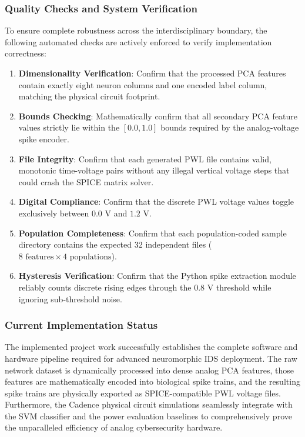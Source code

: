 \documentclass{ieeeaccess}
\begin{document}
\subsubsection{Quality Checks and System Verification}

To ensure complete robustness across the interdisciplinary boundary, the following automated checks are actively enforced to verify implementation correctness:
\begin{enumerate}
\item \textbf{Dimensionality Verification}: Confirm that the processed PCA features contain exactly eight neuron columns and one encoded label column, matching the physical circuit footprint.
\item \textbf{Bounds Checking}: Mathematically confirm that all secondary PCA feature values strictly lie within the $[0.0, 1.0]$ bounds required by the analog-voltage spike encoder.
\item \textbf{File Integrity}: Confirm that each generated PWL file contains valid, monotonic time-voltage pairs without any illegal vertical voltage steps that could crash the SPICE matrix solver.
\item \textbf{Digital Compliance}: Confirm that the discrete PWL voltage values toggle exclusively between $0.0\text{ V}$ and $1.2\text{ V}$.
\item \textbf{Population Completeness}: Confirm that each population-coded sample directory contains the expected 32 independent files ($8 \text{ features} \times 4 \text{ populations}$).
\item \textbf{Hysteresis Verification}: Confirm that the Python spike extraction module reliably counts discrete rising edges through the $0.8\text{ V}$ threshold while ignoring sub-threshold noise.
\end{enumerate}

\subsubsection{Current Implementation Status}

The implemented project work successfully establishes the complete software and hardware pipeline required for advanced neuromorphic IDS deployment. The raw network dataset is dynamically processed into dense analog PCA features, those features are mathematically encoded into biological spike trains, and the resulting spike trains are physically exported as SPICE-compatible PWL voltage files. Furthermore, the Cadence physical circuit simulations seamlessly integrate with the SVM classifier and the power evaluation baselines to comprehensively prove the unparalleled efficiency of analog cybersecurity hardware.
\end{document}
